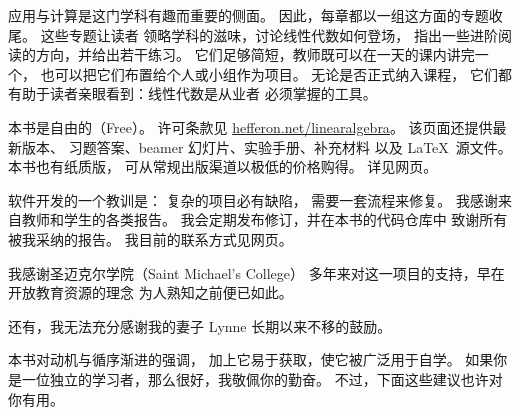 {%
\medskip
{}
应用与计算是这门学科有趣而重要的侧面。
因此，每章都以一组这方面的专题收尾。
这些专题让读者
领略学科的滋味，讨论线性代数如何登场，
指出一些进阶阅读的方向，并给出若干练习。
它们足够简短，教师既可以在一天的课内讲完一个，
也可以把它们布置给个人或小组作为项目。
无论是否正式纳入课程，
它们都有助于读者亲眼看到：线性代数是从业者
必须掌握的工具。




\medskip
{}
本书是自由的（Free）。
许可条款见
\url{hefferon.net/linearalgebra}。
该页面还提供最新版本、
习题答案、beamer 幻灯片、实验手册、补充材料
以及 \LaTeX\ 源文件。
本书也有纸质版，
可从常规出版渠道以极低的价格购得。
详见网页。



\medskip
{}
软件开发的一个教训是：
复杂的项目必有缺陷，
需要一套流程来修复。
我感谢来自教师和学生的各类报告。
我会定期发布修订，并在本书的代码仓库中
致谢所有被我采纳的报告。
我目前的联系方式见网页。

我感谢圣迈克尔学院（Saint Michael's College）
多年来对这一项目的支持，早在开放教育资源的理念
为人熟知之前便已如此。

还有，我无法充分感谢我的妻子 Lynne 长期以来不移的鼓励。



\newcommand{\classday}[1]{\textsc{#1}}
\newcommand{\colwidth}{1.25in}

\medskip
%
本书对动机与循序渐进的强调，
加上它易于获取，使它被广泛用于自学。
如果你是一位独立的学习者，那么很好，我敬佩你的勤奋。
不过，下面这些建议也许对你有用。

}
